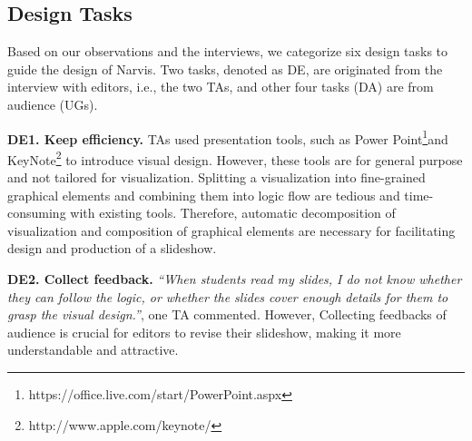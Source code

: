 \subsection{Design Tasks}
Based on our observations and the interviews, we categorize six design tasks to guide the design of Narvis. Two tasks, denoted as DE, are originated from the interview with editors, i.e., the two TAs, and other four tasks (DA) are from audience (UGs).


\textbf{DE1. Keep efficiency.}
TAs used presentation tools, such as Power Point\footnote{https://office.live.com/start/PowerPoint.aspx}and KeyNote\footnote{http://www.apple.com/keynote/} to introduce visual design. However, these tools are for general purpose and not tailored for visualization. Splitting a visualization into fine-grained graphical elements and combining them into logic flow are tedious and time-consuming with existing tools. 
Therefore, automatic decomposition of visualization and composition of graphical elements are necessary for facilitating design and production of a slideshow.


\textbf{DE2. Collect feedback.} \textit{``When students read my slides, I do not know whether they can follow the logic, or whether the slides cover enough details for them to grasp the visual design.''}, one TA commented. 
However, Collecting feedbacks of audience is crucial for editors to revise their slideshow, making it more understandable and attractive.  



